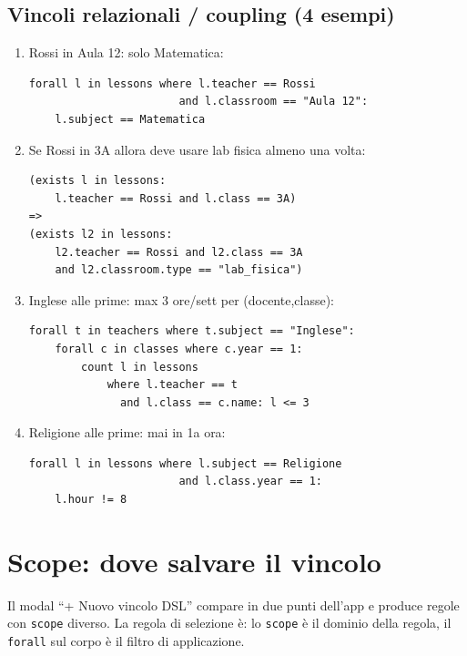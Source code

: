 \subsection{Vincoli relazionali / coupling (4 esempi)}

\begin{enumerate}
\item Rossi in Aula 12: solo Matematica:
\begin{lstlisting}
forall l in lessons where l.teacher == Rossi
                       and l.classroom == "Aula 12":
    l.subject == Matematica
\end{lstlisting}

\item Se Rossi in 3A allora deve usare lab fisica almeno una
volta:
\begin{lstlisting}
(exists l in lessons:
    l.teacher == Rossi and l.class == 3A)
=>
(exists l2 in lessons:
    l2.teacher == Rossi and l2.class == 3A
    and l2.classroom.type == "lab_fisica")
\end{lstlisting}

\item Inglese alle prime: max 3 ore/sett per (docente,classe):
\begin{lstlisting}
forall t in teachers where t.subject == "Inglese":
    forall c in classes where c.year == 1:
        count l in lessons
            where l.teacher == t
              and l.class == c.name: l <= 3
\end{lstlisting}

\item Religione alle prime: mai in 1a ora:
\begin{lstlisting}
forall l in lessons where l.subject == Religione
                       and l.class.year == 1:
    l.hour != 8
\end{lstlisting}
\end{enumerate}

\section{Scope: dove salvare il vincolo}
\label{sec:dsl-scope}

Il modal ``+ Nuovo vincolo DSL'' compare in due punti dell'app
e produce regole con \texttt{scope} diverso. La regola di
selezione \`e: lo \texttt{scope} \`e il dominio della regola, il
\texttt{forall} sul corpo \`e il filtro di applicazione.

